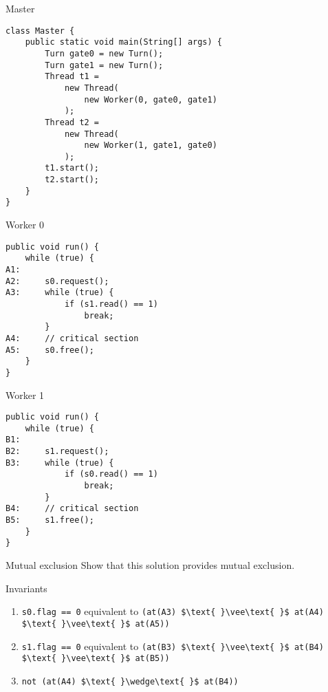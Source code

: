\begin{frame}[fragile]{Master}
\begin{lstlisting}
class Master {
    public static void main(String[] args) {
        Turn gate0 = new Turn();
        Turn gate1 = new Turn();
        Thread t1 = 
            new Thread(
                new Worker(0, gate0, gate1)
            );
        Thread t2 = 
            new Thread(
                new Worker(1, gate1, gate0)
            );
        t1.start();
        t2.start();
    }
}
\end{lstlisting}
\end{frame}

\begin{frame}[fragile]{Worker 0}
\begin{lstlisting}
public void run() {
    while (true) {
A1:
A2:     s0.request();
A3:     while (true) {
            if (s1.read() == 1) 
                break;
        }
A4:     // critical section
A5:     s0.free();
    }
}
\end{lstlisting}
\end{frame}

\begin{frame}[fragile]{Worker 1}
\begin{lstlisting}
public void run() {
    while (true) {
B1:
B2:     s1.request();
B3:     while (true) {
            if (s0.read() == 1) 
                break;
        }
B4:     // critical section
B5:     s1.free();
    }
}
\end{lstlisting}
\end{frame}

\begin{frame}[fragile]{Mutual exclusion}
  Show that this solution provides mutual exclusion.
\end{frame}

\begin{frame}{Invariants}
  \begin{enumerate}
  \item \lstinline!s0.flag == 0! equivalent to
    \lstinline!(at(A3) $\text{ }\vee\text{ }$ at(A4) $\text{ }\vee\text{ }$ at(A5))!
  \item \lstinline!s1.flag == 0! equivalent to
    \lstinline!(at(B3) $\text{ }\vee\text{ }$ at(B4) $\text{ }\vee\text{ }$ at(B5))!
  \item \lstinline!not (at(A4) $\text{ }\wedge\text{ }$ at(B4))!
  \end{enumerate}
\end{frame}

